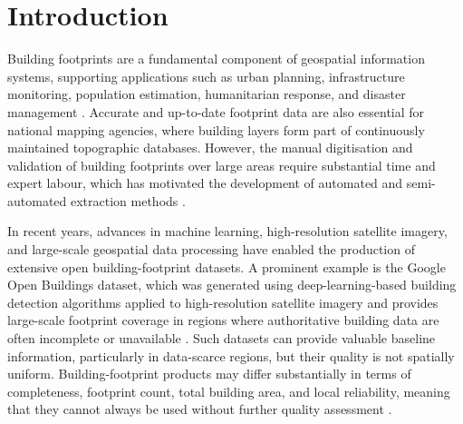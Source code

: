 \chapter{Introduction}
\label{Introduction}

Building footprints are a fundamental component of geospatial information systems, supporting applications such as urban planning, infrastructure monitoring, population estimation, humanitarian response, and disaster management \citep{Awrangjeb_AutomaticExtraction, ZHENG_Buildingdamage, sirko2021continentalscalebuildingdetectionhigh}. Accurate and up-to-date footprint data are also essential for national mapping agencies, where building layers form part of continuously maintained topographic databases. However, the manual digitisation and validation of building footprints over large areas require substantial time and expert labour, which has motivated the development of automated and semi-automated extraction methods \citep{rastogi2022automatic, Luo_overviewbuioldingfootprint}.

In recent years, advances in machine learning, high-resolution satellite imagery, and large-scale geospatial data processing have enabled the production of extensive open building-footprint datasets. A prominent example is the Google Open Buildings dataset, which was generated using deep-learning-based building detection algorithms applied to high-resolution satellite imagery and provides large-scale footprint coverage in regions where authoritative building data are often incomplete or unavailable \citep{sirko2021continentalscalebuildingdetectionhigh, googleopenbuildings}. Such datasets can provide valuable baseline information, particularly in data-scarce regions, but their quality is not spatially uniform. Building-footprint products may differ substantially in terms of completeness, footprint count, total building area, and local reliability, meaning that they cannot always be used without further quality assessment \citep{CHAMBERLAIN2024102104, herfort2023spatio}.

